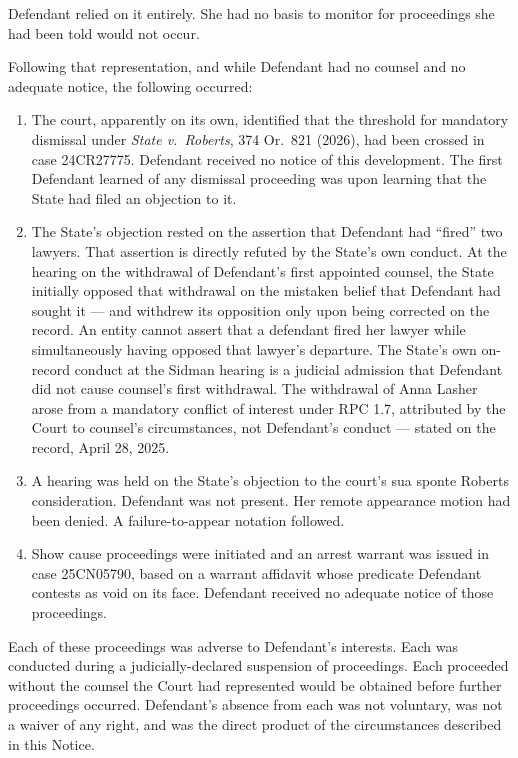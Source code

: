\documentclass[12pt,letterpaper]{article}
\begin{document}
Defendant relied on it entirely. She had no basis to monitor for proceedings she
had been told would not occur.

Following that representation, and while Defendant had no counsel and no adequate
notice, the following occurred:

\begin{enumerate}[leftmargin=*, label=\arabic*., itemsep=4pt]

\item The court, apparently on its own, identified that the threshold for
mandatory dismissal under \textit{State v.\ Roberts}, 374 Or.\ 821 (2026), had
been crossed in case 24CR27775. Defendant received no notice of this development.
The first Defendant learned of any dismissal proceeding was upon learning that the
State had filed an objection to it.

\item The State's objection rested on the assertion that Defendant had ``fired''
two lawyers. That assertion is directly refuted by the State's own conduct. At
the hearing on the withdrawal of Defendant's first appointed counsel, the State
initially opposed that withdrawal on the mistaken belief that Defendant had sought
it --- and withdrew its opposition only upon being corrected on the record. An
entity cannot assert that a defendant fired her lawyer while simultaneously
having opposed that lawyer's departure. The State's own on-record conduct at the
Sidman hearing is a judicial admission that Defendant did not cause counsel's
first withdrawal. The withdrawal of Anna Lasher arose from a mandatory conflict
of interest under RPC 1.7, attributed by the Court to counsel's circumstances,
not Defendant's conduct --- stated on the record, April 28, 2025.

\item A hearing was held on the State's objection to the court's sua sponte
Roberts consideration. Defendant was not present. Her remote appearance motion
had been denied. A failure-to-appear notation followed.

\item Show cause proceedings were initiated and an arrest warrant was issued in
case 25CN05790, based on a warrant affidavit whose predicate Defendant contests
as void on its face. Defendant received no adequate notice of those proceedings.

\end{enumerate}

Each of these proceedings was adverse to Defendant's interests. Each was conducted
during a judicially-declared suspension of proceedings. Each proceeded without
the counsel the Court had represented would be obtained before further proceedings
occurred. Defendant's absence from each was not voluntary, was not a waiver of
any right, and was the direct product of the circumstances described in this
Notice.
\end{document}
